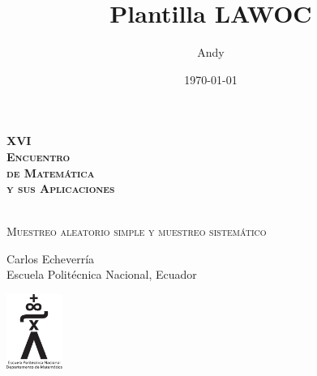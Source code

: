 \documentclass[a5paper,doc,10pt,noapacite]{apa6}
\title{Plantilla LAWOC}
\author{Andy}
\date{\today}
\newcommand{\EPN}{Escuela Politécnica Nacional}
\begin{document}
\pagestyle{empty}
{
	\HUGE
	{\bf\textsc{XVI \\[0.5cm] Encuentro  \\[0.5cm] de Matemática \\[0.5cm] y sus Aplicaciones \\[0.5cm] }}
	\\[1cm]
	\large
	
	\vspace{-2.cm}
	\begin{center}
		
		\textsc{Muestreo aleatorio simple y muestreo sistemático}
		
		\vspace{1.25\baselineskip}
		
		Carlos Echeverría
		\\
		
		\normalsize
		\EPN, Ecuador
	\end{center}
}

\vspace{2cm}
\begin{center}
	\includegraphics[height=2.45cm]{Logos/DM-EPN}
\end{center}
\end{document}
